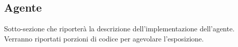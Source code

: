 \subsection{Agente}

Sotto-sezione che riporterà la descrizione dell'implementazione dell'agente.
Verranno riportati porzioni di codice per agevolare l'esposizione.